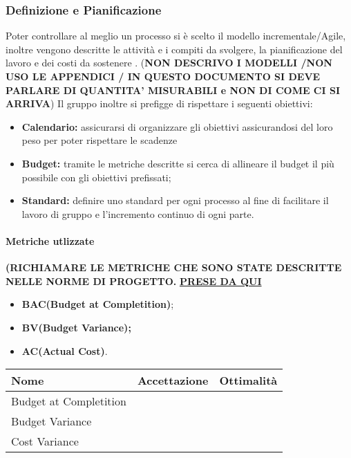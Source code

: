 \subsubsection{Definizione e Pianificazione}
Poter controllare al meglio un processo si è scelto il modello incrementale/Agile, inoltre vengono descritte le attività e i compiti da svolgere, la pianificazione del lavoro e dei costi da sostenere . (\textbf{NON DESCRIVO I MODELLI /NON USO LE APPENDICI / IN QUESTO DOCUMENTO SI DEVE PARLARE DI QUANTITA' MISURABILI e NON DI COME CI SI ARRIVA}) Il gruppo inoltre si prefigge di rispettare i seguenti obiettivi:
\begin{itemize}
		\item{\textbf{Calendario:} assicurarsi di organizzare gli obiettivi assicurandosi del loro peso per poter rispettare le scadenze}
		\item{\textbf{Budget:} tramite le metriche descritte si cerca di allineare il budget il più possibile con gli obiettivi prefissati;}
		\item{\textbf{Standard:} definire uno standard per ogni processo al fine di facilitare il lavoro di gruppo e l'incremento continuo di ogni parte.}
\end{itemize} 
\paragraph{Metriche utlizzate}
\textbf{(RICHIAMARE LE METRICHE CHE SONO STATE DESCRITTE NELLE NORME DI PROGETTO.}
\href{https://it.wikipedia.org/wiki/Metriche_di_progetto}{\textbf{PRESE DA QUI}}
\begin{itemize}
	\item{\textbf{BAC(Budget at Completition)};}
	\item{\textbf{BV(Budget Variance);}}
	\item{\textbf{AC(Actual Cost)}.}
\end{itemize}
\begin{table}[!htpb]
	\begin{tabular}{lll}
		\hline
		\rowcolor[HTML]{34CDF9} 
		{\color[HTML]{333333} \textbf{Nome}}         & {\color[HTML]{333333} \textbf{Accettazione}} & {\color[HTML]{333333} \textbf{Ottimalità}} \\ \hline
		\multicolumn{1}{|l|}{Budget at Completition} & \multicolumn{1}{l|}{}                        & \multicolumn{1}{l|}{}                      \\ \hline
		\multicolumn{1}{|l|}{Budget Variance}        & \multicolumn{1}{l|}{}                        & \multicolumn{1}{l|}{}                      \\ \hline
		\multicolumn{1}{|l|}{Cost Variance}          & \multicolumn{1}{l|}{}                        & \multicolumn{1}{l|}{}                      \\ \hline
	\end{tabular}
\end{table}

